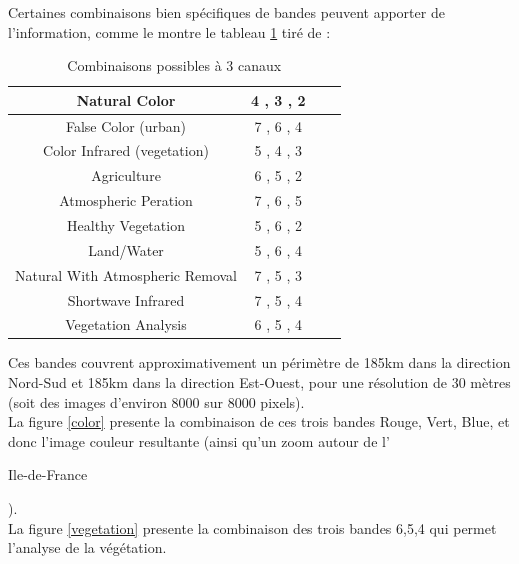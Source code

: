 \documentclass{book}
\begin{document}
\clearpage

Certaines combinaisons bien spécifiques de bandes peuvent apporter de l'information, comme le montre le tableau \ref{combinaison}
tiré de \cite{esri}:\\

\begin{table}
\begin{center}
\begin{tabular}{|c|c|c|c|}
\hline
Natural Color & 4 , 3 , 2\\
\hline
False Color (urban) & 7 , 6 , 4\\
\hline
Color Infrared (vegetation) & 5 , 4 , 3\\
\hline
Agriculture & 6 , 5 , 2\\
\hline
Atmospheric Peration & 7 , 6 , 5\\
\hline
Healthy Vegetation & 5 , 6 , 2\\
\hline
Land/Water & 5 , 6 , 4\\
\hline
Natural With Atmospheric Removal & 7 , 5 , 3\\
\hline
Shortwave Infrared & 7 , 5 , 4\\
\hline
Vegetation Analysis & 6 , 5 , 4\\
\hline
\end{tabular}
\end{center}
\caption{Combinaisons possibles à 3 canaux}
\label{combinaison}
\end{table}
\clearpage

Ces bandes couvrent approximativement un périmètre de 185km dans la direction Nord-Sud et 185km
dans la direction Est-Ouest, pour une résolution de 30 mètres (soit des images d'environ 8000 sur 8000 pixels).\\
La figure \ref{color} presente la combinaison de ces trois bandes Rouge, Vert, Blue, et donc l'image couleur resultante 
(ainsi qu'un zoom autour de l'\begin{itshape}Ile-de-France\end{itshape}).\\
La figure \ref{vegetation} presente la combinaison des trois bandes 6,5,4 qui permet l'analyse de la végétation.\\
\end{document}
